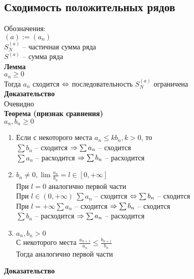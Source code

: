 \documentclass[12pt]{article}
\begin{document}
\subsection{Сходимость положительных рядов}
Обозначения:\\
$(a) := (a_n)$\\
$S_N^{(a)}$ -- частичная сумма ряда\\
$S^{(a)}$ -- сумма ряда\\
\textbf{Лемма}\\
$a_n \geq 0$\\
Тогда $a_n$ сходится $\Leftrightarrow$ последовательность $S_N^{(a)}$ ограничена\\
\textbf{Доказательство}\\
Очевидно\\
\textbf{Теорема (признак сравнения)}\\
$a_n, b_n \geq 0$
\begin{enumerate}
    \item Если с некоторого места $a_n \leq k b_n, k > 0$, то\\
    $\sum b_n$ -- сходится $\Rightarrow \sum a_n$ -- сходится\\
    $\sum a_n$ -- расходится $\Rightarrow \sum b_n$ -- расходится
    \item $b_n \neq 0, \lim \frac{a_n}{b_n} = l \in [0,+\infty]$\\
    При $l = 0$ аналогично первой части\\
    При $l \in (0, +\infty)\ \sum a_n$ -- сходится $\Leftrightarrow \sum b_n$ -- сходится\\
    При $l = +\infty \sum a_n$ -- сходится $\Rightarrow \sum b_n$ -- сходится\\
    $\sum b_n$ -- расходится $\Rightarrow \sum a_n$ -- расходится
    \item $a_n, b_n > 0$\\
    С некоторого места $\frac{a_{n+1}}{a_n} \leq \frac{b_{n+1}}{b_n}$\\
    Тогда аналогично первой части
\end{enumerate}
\textbf{Доказательство}
\end{document}
